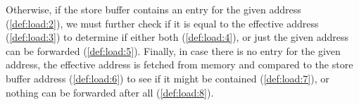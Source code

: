 Otherwise, if the store buffer contains an entry for the given address (\ref{def:load:2}), we must further check if it is equal to the effective address (\ref{def:load:3}) to determine if either both (\ref{def:load:4}), or just the given address can be forwarded (\ref{def:load:5}).
Finally, in case there is no entry for the given address,
the effective address is fetched from memory and compared to the store buffer address (\ref{def:load:6}) to see if it
might be contained (\ref{def:load:7}), or nothing can be forwarded after all (\ref{def:load:8}).




